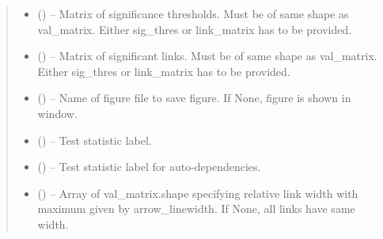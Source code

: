 \documentclass[letterpaper,10pt,english]{sphinxmanual}
\begin{document}
\begin{fulllineitems}
\begin{quote}
\begin{description}
\begin{itemize}
\item {} 
 (\sphinxstyleliteralemphasis{, }\sphinxstyleliteralemphasis{ (}\sphinxstyleliteralemphasis{)}\sphinxstyleliteralemphasis{}) -- Matrix of significance thresholds. Must be of same shape as  val\_matrix.
Either sig\_thres or link\_matrix has to be provided.

\item {} 
 (\sphinxstyleliteralemphasis{, }\sphinxstyleliteralemphasis{ (}\sphinxstyleliteralemphasis{)}\sphinxstyleliteralemphasis{}) -- Matrix of significant links. Must be of same shape as val\_matrix. Either
sig\_thres or link\_matrix has to be provided.

\item {} 
 (\sphinxstyleliteralemphasis{, }\sphinxstyleliteralemphasis{ (}\sphinxstyleliteralemphasis{)}\sphinxstyleliteralemphasis{}) -- Name of figure file to save figure. If None, figure is shown in window.

\item {} 
 (\sphinxstyleliteralemphasis{, }\sphinxstyleliteralemphasis{ (}\sphinxstyleliteralemphasis{)}\sphinxstyleliteralemphasis{}) -- Test statistic label.

\item {} 
 (\sphinxstyleliteralemphasis{, }\sphinxstyleliteralemphasis{ (}\sphinxstyleliteralemphasis{)}\sphinxstyleliteralemphasis{}) -- Test statistic label for auto-dependencies.

\item {} 
 (\sphinxstyleliteralemphasis{, }\sphinxstyleliteralemphasis{ (}\sphinxstyleliteralemphasis{)}\sphinxstyleliteralemphasis{}) -- Array of val\_matrix.shape specifying relative link width with maximum
given by arrow\_linewidth. If None, all links have same width.


\end{itemize}
\end{description}
\end{quote}
\end{fulllineitems}
\end{document}
